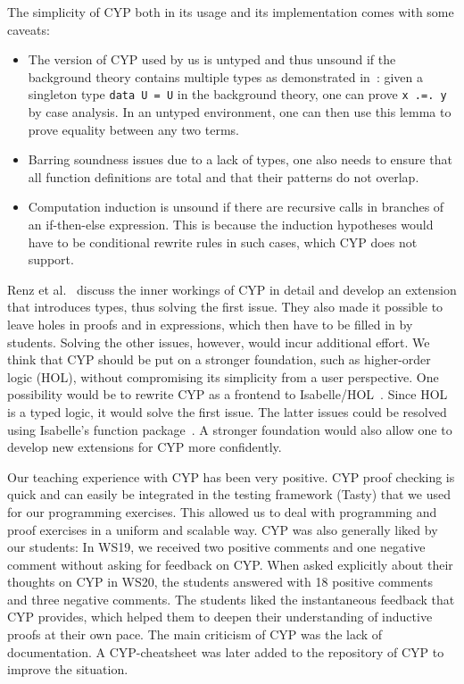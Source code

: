 The simplicity of CYP both in its usage and its implementation comes with some caveats:
\begin{itemize}
    \item The version of CYP used by us is untyped and thus unsound if the background theory contains multiple types as demonstrated in~\cite{cyp_holes}: given a singleton type \lstinline[style=cyp]!data U = U! in the background theory,
      one can prove \lstinline[style=cyp]!x .=. y! by case analysis.
        In an untyped environment, one can then use this lemma to prove equality between any two terms.
    \item Barring soundness issues due to a lack of types, one also needs to ensure that all function definitions are total and that their patterns do not overlap.
    \item Computation induction is unsound if there are recursive calls in branches of an if-then-else expression.
      This is because the induction hypotheses would have to be conditional rewrite rules in such cases, which CYP does not support.
\end{itemize}
Renz et al.~\cite{cyp_holes} discuss the inner workings of CYP in detail and develop an extension that introduces types,
thus solving the first issue.
They also made it possible to leave holes in proofs and in expressions, which then have to be filled in by students.
Solving the other issues, however, would incur additional effort.
We think that CYP should be put on a stronger foundation,
such as higher-order logic (HOL),
without compromising its simplicity from a user perspective.
One possibility would be to rewrite CYP as a frontend to Isabelle/HOL~\cite{isabelle}.
Since HOL is a typed logic, it would solve the first issue.
The latter issues could be resolved using Isabelle's function package~\cite{isabelle_functions}.
A stronger foundation would also allow one to develop new extensions for CYP more confidently.

Our teaching experience with CYP has been very positive.
CYP proof checking is quick and can easily be integrated in the testing framework (Tasty) that we used for our programming exercises.
This allowed us to deal with programming and proof exercises in a uniform and scalable way.
CYP was also generally liked by our students:
In WS19,
we received two positive comments and one negative comment without asking for feedback on CYP.
When asked explicitly about their thoughts on CYP in WS20,
the students answered with 18 positive comments and three negative comments.
The students liked the instantaneous feedback that CYP provides,
which helped them to deepen their understanding of inductive proofs at their own pace.
The main criticism of CYP was the lack of documentation.
A CYP-cheatsheet was later added to the repository of CYP to improve the situation.

